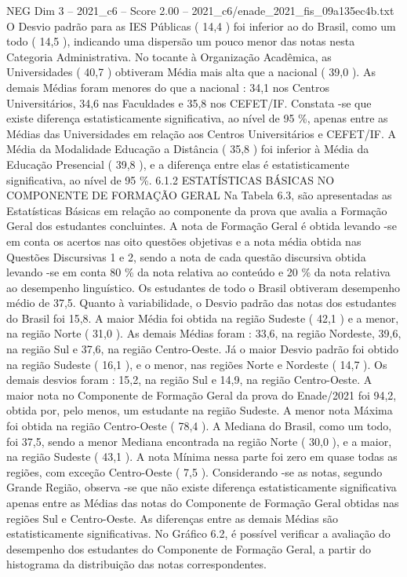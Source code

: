 \begin{textsample}{NEG Dim 3 – 2021\_c6 – Score 2.00 – 2021\_c6/enade\_2021\_fis\_09a135ec4b.txt}
O Desvio padrão para as IES Públicas ( 14,4 ) foi inferior ao do Brasil, como um todo ( 14,5 ), indicando uma dispersão um pouco menor das notas nesta Categoria Administrativa.
No tocante à Organização Acadêmica, as Universidades ( 40,7 ) obtiveram Média mais alta que a nacional ( 39,0 ).
As demais Médias foram menores do que a nacional : 34,1 nos Centros Universitários, 34,6 nas Faculdades e 35,8 nos CEFET/IF.
Constata -se que existe diferença estatisticamente significativa, ao nível de 95 \%, apenas entre as Médias das Universidades em relação aos Centros Universitários e CEFET/IF.
A Média da Modalidade Educação a Distância ( 35,8 ) foi inferior à Média da Educação Presencial ( 39,8 ), e a diferença entre elas é estatisticamente significativa, ao nível de 95 \%. 6.1.2 ESTATÍSTICAS BÁSICAS NO COMPONENTE DE FORMAÇÃO GERAL Na Tabela 6.3, são apresentadas as Estatísticas Básicas em relação ao componente da prova que avalia a Formação Geral dos estudantes concluintes.
A nota de Formação Geral é obtida levando -se em conta os acertos nas oito questões objetivas e a nota média obtida nas Questões Discursivas 1 e 2, sendo a nota de cada questão discursiva obtida levando -se em conta 80 \% da nota relativa ao conteúdo e 20 \% da nota relativa ao desempenho linguístico.
Os estudantes de todo o Brasil obtiveram desempenho médio de 37,5.
Quanto à variabilidade, o Desvio padrão das notas dos estudantes do Brasil foi 15,8.
A maior Média foi obtida na região Sudeste ( 42,1 ) e a menor, na região Norte ( 31,0 ).
As demais Médias foram : 33,6, na região Nordeste, 39,6, na região Sul e 37,6, na região Centro-Oeste.
Já o maior Desvio padrão foi obtido na região Sudeste ( 16,1 ), e o menor, nas regiões Norte e Nordeste ( 14,7 ).
Os demais desvios foram : 15,2, na região Sul e 14,9, na região Centro-Oeste.
A maior nota no Componente de Formação Geral da prova do Enade/2021 foi 94,2, obtida por, pelo menos, um estudante na região Sudeste.
A menor nota Máxima foi obtida na região Centro-Oeste ( 78,4 ).
A Mediana do Brasil, como um todo, foi 37,5, sendo a menor Mediana encontrada na região Norte ( 30,0 ), e a maior, na região Sudeste ( 43,1 ).
A nota Mínima nessa parte foi zero em quase todas as regiões, com exceção Centro-Oeste ( 7,5 ).
Considerando -se as notas, segundo Grande Região, observa -se que não existe diferença estatisticamente significativa apenas entre as Médias das notas do Componente de Formação Geral obtidas nas regiões Sul e Centro-Oeste.
As diferenças entre as demais Médias são estatisticamente significativas.
No Gráfico 6.2, é possível verificar a avaliação do desempenho dos estudantes do Componente de Formação Geral, a partir do histograma da distribuição das notas correspondentes.

\end{textsample}
